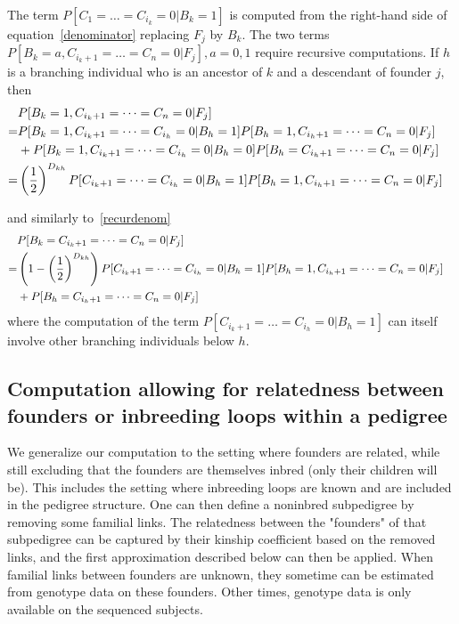 \documentclass[12pt]{aastex}
\begin{document}
The term $ P[C_1 = \dots = C_{i_k} = 0 | B_k = 1] $ is computed from the right-hand side of equation~\ref{denominator} replacing $F_j$ by $B_k$. The two terms $ P[ B_k = a, C_{i_k+1} = \dots = C_n = 0 | F_j], a = 0,1$ require recursive computations. If $h$ is a branching individual who is an ancestor of $k$ and a descendant of founder $j$, then
\begin{eqnarray}
& P[ B_k = 1, C_{i_k+1} = \dots = C_n = 0 | F_j] & \nonumber \\
= & P[ B_k = 1, C_{i_k+1} = \dots = C_{i_h} = 0 | B_h = 1] P[ B_h = 1, C_{i_h+1} = \dots = C_n = 0 | F_j] & \nonumber \\ 
& + P[ B_k = 1, C_{i_k+1} = \dots = C_{i_h} = 0 | B_h = 0] P[ B_h = C_{i_h+1} = \dots = C_n = 0 | F_j] & \nonumber \\
 =& \left( 1 \over 2 \right)^{D_{kh}} P[ C_{i_k+1} = \dots = C_{i_h} = 0 | B_h = 1] P[ B_h = 1, C_{i_h+1} = \dots = C_n = 0 | F_j] & 
\end{eqnarray}
 
and similarly to~\ref{recurdenom}
\begin{eqnarray}
& P[ B_k = C_{i_k+1} = \dots = C_n = 0 | F_j] & \nonumber \\
= &  \left( 1 - \left( 1 \over 2 \right)^{D_{kh}} \right) P[ C_{i_k+1} = \dots = C_{i_h} = 0 | B_h = 1] P[ B_h = 1, C_{i_h+1} = \dots = C_n = 0 | F_j]  & \nonumber \\
& + P[ B_h = C_{i_h+1} = \dots = C_n = 0 | F_j] &
\end{eqnarray}
where the computation of the term $ P[ C_{i_k+1} = \dots = C_{i_h} = 0 | B_h = 1]$ can itself involve other branching individuals below $h$.

\subsection{Computation allowing for relatedness between founders or inbreeding loops within a pedigree}

We generalize our computation to the setting where founders are related, while still excluding that the founders are themselves inbred (only their children will be). This includes the setting where inbreeding loops are known and are included in the pedigree structure. One can then define a noninbred subpedigree by removing some familial links. The relatedness between the "founders" of that subpedigree can be captured by their kinship coefficient based on the removed links, and the first approximation described below can then be applied. When familial links between founders are unknown, they sometime can be estimated from genotype data on these founders. Other times, genotype data is only available on the sequenced subjects.\\ 
\end{document}
